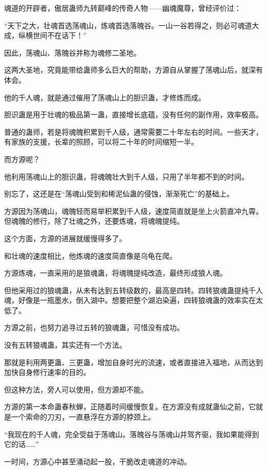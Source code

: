 
\begin{this_body}

魂道的开辟者，傲居蛊师九转巅峰的传奇人物——幽魂魔尊，曾经评价过：

“天下之大，壮魂首选荡魂山，炼魂首选落魄谷。一山一谷若得之，则必可魂道大成，纵横世间不在话下！”

因此，荡魂山、落魄谷并称为魂修二圣地。

这两大圣地，究竟能带给蛊师多么巨大的帮助，方源自从掌握了荡魂山后，就深有体会。

他的千人魂，就是通过催用了荡魂山上的胆识蛊，才修炼而成。

胆识蛊是用于壮魂的极品第一蛊，直接增长底蕴，没有任何的副作用，效率极高。

普通的蛊师，若是将魂魄积累到千人级，通常需要二十年左右的时间。一些天才，有家族的支援，长辈的照顾，可以将二十年的时间缩短一半。

而方源呢？

他利用荡魂山上的胆识蛊，将魂魄壮大到千人级，只用了半年都不到的时间。

别忘了，这还是在“荡魂山受到和稀泥仙蛊的侵蚀，渐渐死亡”的基础上。

方源因为荡魂山，魂魄轻而易举积累到千人级，速度简直就是坐上火箭直冲九霄。但魂魄的修行，除了壮魂之外，还要炼魂，将魂魄提纯。

这个方面，方源的进展就缓慢得多了。

和壮魂的速度相比，他炼魂的速度简直像是乌龟在爬。

方源炼魂，一直采用的是狼魂蛊，将魂魄提纯改造，最终形成狼人魂。

但他采用过的狼魂蛊，从未有达到五转级数的，最高是四转。四转狼魂蛊提纯千人魂，好像是一瓶墨水，倒入湖中。想要把整个湖泊染遍，四转狼魂蛊的效率实在太低了。

方源之前，也努力追寻过五转的狼魂蛊，可惜没有成功。

没有五转狼魂蛊，其实还有一个方法。

那就是利用两更蛊、三更蛊，增加自身时光的流速，或者直接进入福地，从而达到加快自身修行速率的目的。

但这种方法，旁人可以使用，但方源却不能。

方源的第一本命蛊春秋蝉，正随着时间缓慢恢复。在方源没有成就蛊仙之前，它就是一个索命的刀刃，一直悬浮在方源的脖颈上。

“我现在的千人魂，完全受益于荡魂山。落魄谷与荡魂山并驾齐驱，我如果能得到它的话……”

一时间，方源心中甚至涌动起一股，干脆改走魂道的冲动。


\end{this_body}
